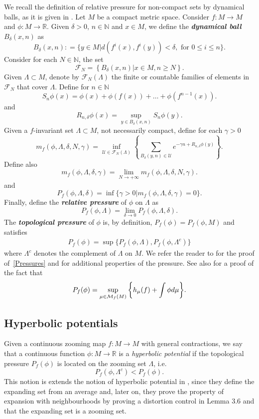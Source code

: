 \documentclass[12pt,a4paper]{amsart}
\theoremstyle{plain}
\begin{document}
We recall the definition of relative pressure for non-compact sets by dynamical balls, as it is given in \cite{ARS}.
Let $M$ be a compact metric space. Consider $f:M \to M$ and $\phi: M \to \mathbb{R}$. Given $\delta > 0$, $n \in \mathbb{N}$ and $x \in M$, we define the 
\textbf{\textit{dynamical ball}} $B_{\delta}(x,n)$ as 
\[
B_{\delta}(x,n): = \{y \in M |d(f^{i}(x),f^{i}(y)) < \delta, \,\, \text{for} \,\, 0 \leq i \leq n\}.
\]
Consider for each $N \in \mathbb{N}$, the set
\[
\mathcal{F}_{N} = \left\{B_{\delta}(x,n) |x \in M, n \geq N\right\}.
\]
Given $\Lambda \subset M$, denote by $\mathcal{F}_{N}(\Lambda)$ the finite or countable families of elements in $\mathcal{F}_{N}$ that cover $\Lambda$. Define for $n \in \mathbb{N}$
\[
S_{n}\phi(x) = \phi(x) + \phi(f(x)) + \dots + \phi(f^{n-1}(x)).
\]
and
\[
\displaystyle R_{n,\delta}\phi(x) = \sup_{y \in B_{\delta}(x,n)} S_{n}\phi(y).
\]
Given a $f$-invariant set $\Lambda \subset M$, not necessarily compact, define for each $\gamma > 0$
\[
\displaystyle m_{f}(\phi, \Lambda, \delta, N, \gamma) = \inf_{\mathcal{U} \in \mathcal{F}_{N}(\Lambda)} \left\{ \sum_{B_{\delta}(y,n) \in \mathcal{U}}
e^{-\gamma n + R_{n,\delta}\phi(y)} \right\}.
\]
Define also
\[
\displaystyle m_{f}(\phi, \Lambda, \delta, \gamma) = \lim_{N \to + \infty} m_{f}(\phi, \Lambda, \delta, N, \gamma).
\]
and
\[
P_{f}(\phi, \Lambda, \delta) = \inf \{\gamma > 0 |m_{f}(\phi, \Lambda, \delta, \gamma) = 0\}.
\]
Finally, define the \textbf{\textit{relative pressure}} of $\phi$ on $\Lambda$ as
\[
P_{f}(\phi,\Lambda) = \lim_{\delta \to 0} P_{f}(\phi, \Lambda, \delta).
\]
The \textbf{\textit{topological pressure}} of $\phi$ is, by definition, $P_{f}(\phi) = P_{f}(\phi, M)$ and satisfies
\begin{eqnarray}
	\label{Pressures}
	P_{f}(\phi) = \sup \{P_{f}(\phi,\Lambda), P_{f}(\phi,\Lambda^{c})\}
\end{eqnarray}
where $\Lambda^{c}$ denotes the complement of $\Lambda$ on $M$. We refer the reader to \cite{Pe2} for the proof of~\eqref{Pressures} and for additional properties of the pressure.
See also \cite{W} for a proof of the fact that
\[
\displaystyle P_{f}(\phi) = \sup_{\mu \in \mathcal{M}_{f}(M)} \bigg{\{} h_{\mu}(f) + \int \phi d \mu \bigg{\}}.
\]

\subsection{Hyperbolic potentials}

Given a continuous zooming map $f:M \to M$ with general contractions, we say that a   continuous function $\phi : M \to \mathbb{R}$ is a \emph{hyperbolic potential} if the topological pressure $P_{f}(\phi)$ is located on the zooming set $\Lambda$, i.e.
\[
P_{f}(\phi,\Lambda^{c}) < P_{f}(\phi).
\]
This notion is extends the notion of hyperbolic potential in \cite{RV}, since they define the expanding set from an average and, later on, they prove the property of expansion with neighbourhoods by proving a distortion control in Lemma 3.6 and that the expanding set is a zooming set.
\end{document}
